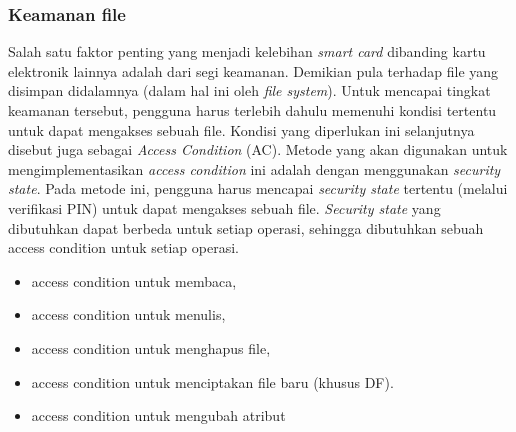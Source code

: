 \subsubsection{Keamanan file}
\label{file-security}

Salah satu faktor penting yang menjadi kelebihan \textsl{smart card} dibanding kartu elektronik lainnya adalah dari segi keamanan. Demikian pula terhadap file yang disimpan didalamnya (dalam hal ini oleh \emph{file system}). Untuk mencapai tingkat keamanan tersebut, pengguna harus terlebih dahulu memenuhi kondisi tertentu untuk dapat mengakses sebuah file. Kondisi yang diperlukan ini selanjutnya disebut juga sebagai \emph{Access Condition} (AC). Metode yang akan digunakan untuk mengimplementasikan \emph{access condition} ini adalah dengan menggunakan \emph{security state}. Pada metode ini, pengguna harus mencapai \emph{security state} tertentu (melalui verifikasi PIN) untuk dapat mengakses sebuah file. \emph{Security state} yang dibutuhkan dapat berbeda untuk setiap operasi, sehingga dibutuhkan sebuah access condition untuk setiap operasi. 

\begin{itemize}
\item access condition untuk membaca,
\item access condition untuk menulis,
\item access condition untuk menghapus file,
\item access condition untuk menciptakan file baru (khusus DF).
\item access condition untuk mengubah atribut
\end{itemize}
